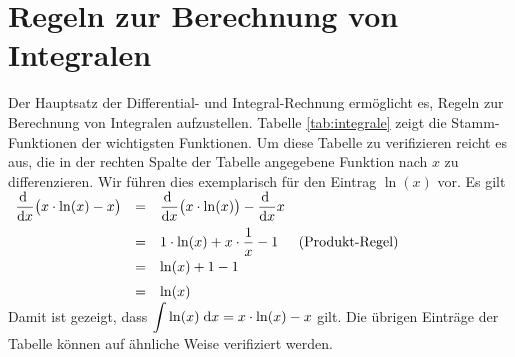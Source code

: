 \section{Regeln zur Berechnung von Integralen}
Der Hauptsatz der Differential- und Integral-Rechnung erm\"oglicht es, Regeln zur Berechnung
von Integralen aufzustellen.  Tabelle \ref{tab:integrale} zeigt die Stamm-Funktionen der
wichtigsten Funktionen.  Um diese Tabelle zu verifizieren reicht es aus, die in der rechten
Spalte der Tabelle angegebene Funktion nach $x$ zu differenzieren.
Wir f\"uhren dies exemplarisch f\"ur den Eintrag $\ln(x)$ vor.  Es gilt
\\[0.3cm]
\hspace*{1.3cm}
$
\begin{array}[t]{lcll}  
\displaystyle\frac{\textrm{d}\;}{\textrm{d}x} \bigl( x\cdot \ln(x) - x\bigr) & = & \displaystyle\frac{\textrm{d}\;}{\textrm{d}x} \bigl( x\cdot \ln(x) \bigr) - \displaystyle\frac{\textrm{d}\;}{\textrm{d}x} x \\[0.3cm] 
 & = &\displaystyle 1 \cdot  \ln(x) + x \cdot  \frac{1}{x} - 1 & (\mbox{Produkt-Regel}) \\[0.2cm]
 & = &\displaystyle \ln(x) + 1 - 1  \\[0.2cm]
 & = & \displaystyle \ln(x) \\
\end{array}
$
\\[0.3cm]
Damit ist gezeigt, dass $\displaystyle\int \ln(x)\;\textrm{d} x = x\cdot \ln(x) - x$ gilt.  Die \"ubrigen Eintr\"age der
Tabelle k\"onnen auf \"ahnliche Weise verifiziert werden.

